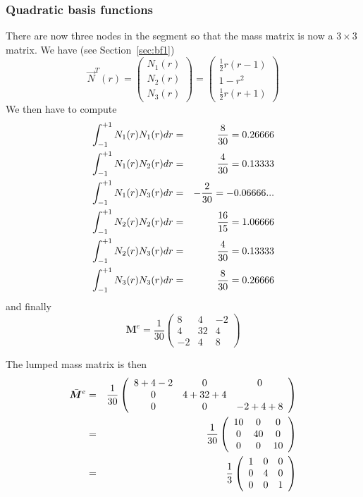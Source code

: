 \subsubsection{Quadratic basis functions}
There are now three nodes in the segment so that the mass matrix 
is now a $3\times3$ matrix. We have (see Section~\ref{sec:bf1}) 
\begin{equation}
{\vec N}^T(r) = 
\left(
\begin{array}{c}
N_1(r) \\ 
N_2(r) \\ 
N_3(r) 
\end{array}
\right)
=
\left(
\begin{array}{c}
\frac{1}{2} r (r-1) \\
1-r^2 \\
\frac{1}{2} r (r+1) 
\end{array}
\right)
\end{equation}
We then have to compute
\begin{eqnarray}
\int_{-1}^{+1} N_1(r) N_1(r) dr &=& \frac{8}{30}  = 0.26666 \nonumber\\
\int_{-1}^{+1} N_1(r) N_2(r) dr &=& \frac{4}{30}  =0.13333  \nonumber\\
\int_{-1}^{+1} N_1(r) N_3(r) dr &=& -\frac{2}{30} =-0.06666...\nonumber\\ 
\int_{-1}^{+1} N_2(r) N_2(r) dr &=& \frac{16}{15} = 1.06666 \nonumber\\
\int_{-1}^{+1} N_2(r) N_3(r) dr &=& \frac{4}{30}  =0.13333 \nonumber\\
\int_{-1}^{+1} N_3(r) N_3(r) dr &=& \frac{8}{30} = 0.26666  \nonumber
\end{eqnarray}
and finally 
\begin{equation}
{\bm M}^e 
=
\frac{1}{30}
\left(
\begin{array}{ccc}
8  & 4 & -2 \\
4  & 32 & 4 \\
-2 & 4 & 8
\end{array}
\right)
\end{equation}


The lumped mass matrix is then
\begin{eqnarray}
\bar{\bm M}^e 
&=&
\frac{1}{30}
\left(
\begin{array}{ccc}
8 + 4  -2 & 0 & 0\\
0 & 4 + 32 + 4 \\
0 & 0 & -2 + 4 + 8
\end{array}
\right) \nonumber\\
&=&
\frac{1}{30}
\left(
\begin{array}{ccc}
10 & 0 & 0\\
0 & 40 & 0\\
0 & 0 & 10 
\end{array}
\right) \nonumber\\
&=&
\frac{1}{3}
\left(
\begin{array}{ccc}
1 & 0 & 0\\
0 & 4 & 0\\
0 & 0 & 1 
\end{array}
\right) 
\end{eqnarray}

